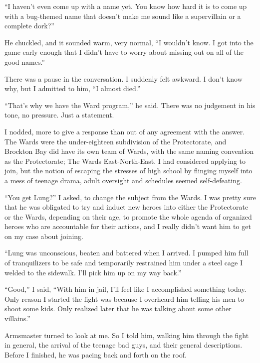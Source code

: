 ``I haven't even come up with a name yet.  You know how hard it is to come up with a bug-themed name that doesn't make me sound like a supervillain or a complete dork?''



He chuckled, and it sounded warm, very normal, ``I wouldn't know.  I got into the game early enough that I didn't have to worry about missing out on all of the good names.''



There was a pause in the conversation.  I suddenly felt awkward.  I don't know why, but I admitted to him, ``I almost died.''



``That's why we have the Ward program,'' he said.  There was no judgement in his tone, no pressure.  Just a statement.



I nodded, more to give a response than out of any agreement with the answer.  The Wards were the under-eighteen subdivision of the Protectorate, and Brockton Bay did have its own team of Wards, with the same naming convention as the Protectorate; The Wards East-North-East.  I had considered applying to join, but the notion of escaping the stresses of high school by flinging myself into a mess of teenage drama, adult oversight and schedules seemed self-defeating.



``You get Lung?'' I asked, to change the subject from the Wards.  I was pretty sure that he was obligated to try and induct new heroes into either the Protectorate or the Wards, depending on their age, to promote the whole agenda of organized heroes who are accountable for their actions, and I really didn't want him to get on my case about joining.



``Lung was unconscious, beaten and battered when I arrived.  I pumped him full of tranquilizers to be safe and temporarily restrained him under a steel cage I welded to the sidewalk.  I'll pick him up on my way back.''



``Good,'' I said, ``With him in jail, I'll feel like I accomplished something today.  Only reason I started the fight was because I overheard him telling his men to shoot some kids.  Only realized later that he was talking about some other villains.''



Armsmaster turned to look at me.  So I told him, walking him through the fight in general, the arrival of the teenage bad guys, and their general descriptions.  Before I finished, he was pacing back and forth on the roof.



